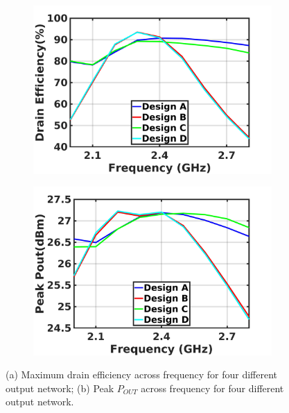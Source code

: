 \documentclass[conference]{IEEEtran}
\begin{document}
\begin{figure}[!t]
\captionsetup{font=footnotesize}
\centering
\begin{subfigure}{0.24\textwidth}
\centering
\includegraphics[width=1\textwidth]{Images/Output_Network_Comp/Comp_DE.jpg}
\caption{}
\label{fig:Comp_DE}
\end{subfigure}
\begin{subfigure}{0.24\textwidth}
\includegraphics[width=1\textwidth]{Images/Output_Network_Comp/Comp_Pout.jpg}
\caption{}
\label{fig:Comp_Pout}
\end{subfigure}
\caption{(a) Maximum drain efficiency across frequency for four different output network; (b) Peak $P_{OUT}$ across frequency for four different output network.}
\label{fig:Comp_Pout_DE}
\vspace{-0.25in}
\end{figure}
\end{document}
